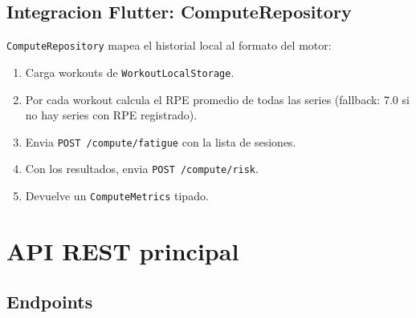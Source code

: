\documentclass[12pt, a4paper]{article}
\begin{document}
\subsection{Integracion Flutter: ComputeRepository}

\texttt{ComputeRepository} mapea el historial local al formato del motor:

\begin{enumerate}
  \item Carga workouts de \texttt{WorkoutLocalStorage}.
  \item Por cada workout calcula el RPE promedio de todas las series
        (fallback: 7.0 si no hay series con RPE registrado).
  \item Envia \texttt{POST /compute/fatigue} con la lista de sesiones.
  \item Con los resultados, envia \texttt{POST /compute/risk}.
  \item Devuelve un \texttt{ComputeMetrics} tipado.
\end{enumerate}

\section{API REST principal}

\subsection{Endpoints}
\end{document}
